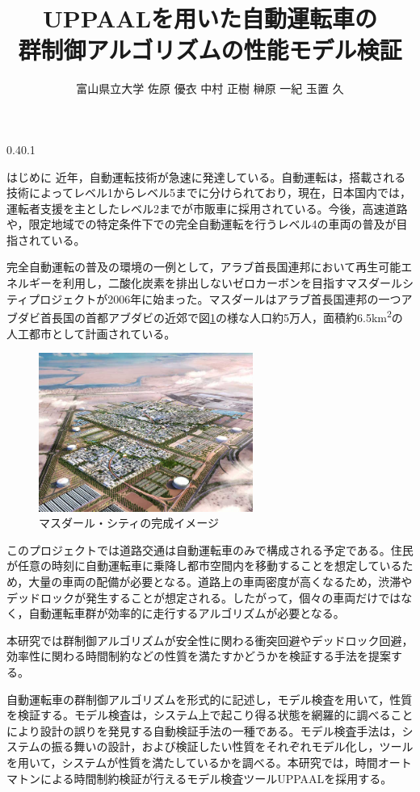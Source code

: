 \documentclass[twocolumn,10pt]{jsarticle}
\author{富山県立大学	佐原 優衣	中村 正樹	榊原 一紀	玉置 久}
\date{}
\title{UPPAALを用いた自動運転車の\\群制御アルゴリズムの性能モデル検証}
\makeatletter
\renewcommand{\section}{%
   \@startsection{section}{1}{\z@}%
   {0.4\Cvs}{0.1\Cvs}%
   {\normalfont\large\headfont\raggedright}}
\makeatother
\begin{document}
\maketitle
\thispagestyle{empty}
\section{はじめに}
近年，自動運転技術が急速に発達している。自動運転は，搭載される技術によってレベル1からレベル5までに分けられており，現在，日本国内では，運転者支援を主としたレベル2までが市販車に採用されている。今後，高速道路や，限定地域での特定条件下での完全自動運転を行うレベル4の車両の普及が目指されている。
	
	完全自動運転の普及の環境の一例として，アラブ首長国連邦において再生可能エネルギーを利用し，二酸化炭素を排出しないゼロカーボンを目指すマスダールシティプロジェクトが2006年に始まった。マスダールはアラブ首長国連邦の一つアブダビ首長国の首都アブダビの近郊で図\ref{Masdar}の様な人口約5万人，面積約6.5\si{km^{2}}の人工都市として計画されている。
	
	\begin{figure}[htbp]
	\centering
	\includegraphics[width=70mm]{Masdar.jpg}
	\caption{マスダール・シティの完成イメージ \protect \footnotemark}
	\label{Masdar}
	\end{figure}
	このプロジェクトでは道路交通は自動運転車のみで構成される予定である。住民が任意の時刻に自動運転車に乗降し都市空間内を移動することを想定しているため，大量の車両の配備が必要となる。道路上の車両密度が高くなるため，渋滞やデッドロックが発生することが想定される。したがって，個々の車両だけではなく，自動運転車群が効率的に走行するアルゴリズムが必要となる。
	
	本研究では群制御アルゴリズムが安全性に関わる衝突回避やデッドロック回避，効率性に関わる時間制約などの性質を満たすかどうかを検証する手法を提案する。
	
	自動運転車の群制御アルゴリズムを形式的に記述し，モデル検査を用いて，性質を検証する。モデル検査は，システム上で起こり得る状態を網羅的に調べることにより設計の誤りを発見する自動検証手法の一種である。モデル検査手法は，システムの振る舞いの設計，および検証したい性質をそれぞれモデル化し，ツールを用いて，システムが性質を満たしているかを調べる。本研究では，時間オートマトンによる時間制約検証が行えるモデル検査ツールUPPAAL\cite{u1}を採用する。
\end{document}
